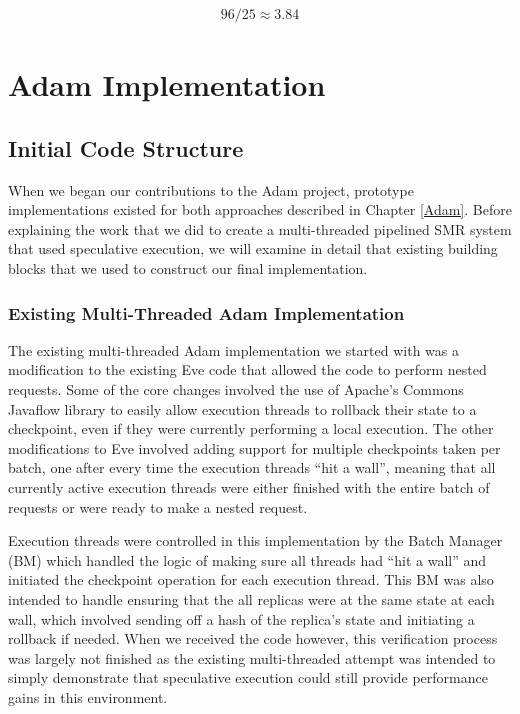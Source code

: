 \documentclass[11pt, oneside]{report}
\begin{document}
\begin{align*}
96 / 25 \approx 3.84
\end{align*}

\chapter{Adam Implementation}\label{AdamImplementation}

\section{Initial Code Structure}\label{existing}

When we began our contributions to the Adam project, prototype implementations existed for both approaches described in Chapter \ref{Adam}. 
Before explaining the work that we did to create a multi-threaded pipelined SMR system that used speculative execution, we will examine in detail that existing building blocks that we used to construct our final implementation.

\subsection{Existing Multi-Threaded Adam Implementation}\label{BM}

The existing multi-threaded Adam implementation we started with was a modification to the existing Eve \cite{eve} code that allowed the code to perform nested requests. 
Some of the core changes involved the use of Apache's Commons Javaflow library \cite{javaflow} to easily allow execution threads to rollback their state to a checkpoint, even if they were currently performing a local execution. 
The other modifications to Eve involved adding support for multiple checkpoints taken per batch, one after every time the execution threads ``hit a wall'', meaning that all currently active execution threads were either finished with the entire batch of requests or were ready to make a nested request.

Execution threads were controlled in this implementation by the Batch Manager (BM) which handled the logic of making sure all threads had ``hit a wall'' and initiated the checkpoint operation for each execution thread. 
This BM was also intended to handle ensuring that the all replicas were at the same state at each wall, which involved sending off a hash of the replica's state and initiating a rollback if needed. 
When we received the code however, this verification process was largely not finished as the existing multi-threaded attempt was intended to simply demonstrate that speculative execution could still provide performance gains in this environment.
\end{document}
